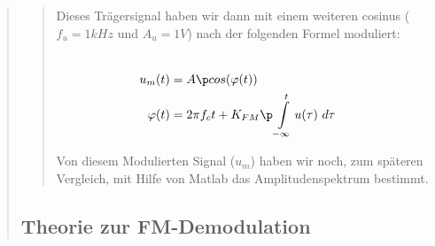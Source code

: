 \begin{quote}
\begin{quote}
        
        Dieses Trägersignal haben wir dann mit einem weiteren cosinus ($f_u = 1kHz$ und $A_u = 1V$) nach der folgenden Formel
        moduliert:
        
        \begin{equation*}
        \begin{split}
        \\
                u_m(t) &= A \p cos(\varphi(t))
        \\
            \varphi(t) &= 2 \pi f_c t + K_{FM} \p \int\limits_{-\infty}^t u(\tau) \ d\tau  
        \\
        \end{split}
        \end{equation*}
        \label{equ:fm}
        
        Von diesem Modulierten Signal ($u_m$) haben wir noch, zum späteren Vergleich, mit Hilfe von Matlab das Amplitudenspektrum
        bestimmt.
        
        
    \end{quote}
    
    
    \subsection{Theorie zur FM-Demodulation}
    \begin{quote}
        
    \end{quote}
    
    
\end{quote}

